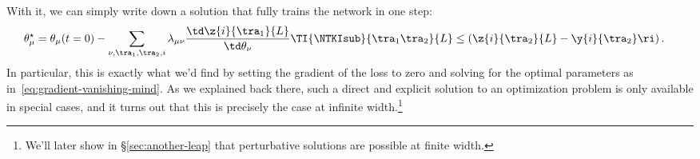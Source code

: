 With it, we can simply write down a solution that fully trains the network in one step:
\begin{align}
\theta_\mu^\star &= \theta_\mu(t=0)  - \sum_{\nu,\tra_1,\tra_2,i}\lambda_{\mu\nu} \frac{\td \z{i}{\tra_1}{L}}{\td \theta_\nu} \TI{\NTKIsub}{\tra_1 \tra_2}{L}\le(\z{i}{\tra_2}{L}-\y{i}{\tra_2}\ri) \, . \label{eq:parameters-update-reprint-generalized}
\end{align}
In particular, this is exactly what we'd find by setting the gradient of the loss to zero and solving for the optimal parameters as in~\eqref{eq:gradient-vanishing-mind}.
As we explained back there, such a direct and explicit solution to an optimization problem is only available in special cases, and
it turns out that this is precisely the case at infinite width.\footnote{We'll later show in \S\ref{sec:another-leap} that perturbative solutions are possible at finite width.}






